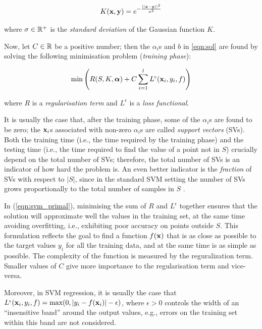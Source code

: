 \begin{equation} \label{eqn:ker}
  K(\mathbf{x},\mathbf{y}) = e^{-\frac{||\mathbf{x}-\mathbf{y}||^2}{\sigma^2}}
\end{equation}

\noindent where $\sigma \in \mathbb{R}^{+}$ is the \emph{standard deviation} of
the Gaussian function $K$.

Now, let $C \in \mathbb{R}$ be a positive number; then the $\alpha_i$s and
$b$ in \ref{eqn:sol} are found by solving the following minimisation
problem (\emph{training phase}):

\begin{equation} \label{eqn:svm_primal}
  \min \left( R(S,K,\boldsymbol{\alpha}) + C \sum_{i=1}^l L^\epsilon (\mathbf{x}_i,y_i,f) \right)
\end{equation}

\noindent where $R$ is a \emph{regularisation term} and
$L^\epsilon$ is a \emph{loss functional}.

It is usually the case that, after the training phase, some of the
$\alpha_i$s are found to be zero; the $\mathbf{x}_i$s associated with
non-zero $\alpha_i$s are called \emph{support vectors} (SVs). Both the
training time (i.e., the time required by the training phase) and the
testing time (i.e., the time required to find the value of a point not
in $S$) crucially depend on the total number of SVs; therefore, the
total number of SVs is an indicator of how hard the problem is. An
even better indicator is the \emph{fraction} of SVs with respect to
$|S|$, since in the standard SVM setting the number of SVs grows
proportionally to the total number of samples in $S$
\cite{Steinwart03}.

In (\ref{eqn:svm_primal}), minimising the sum of $R$ and $L^\epsilon$
together ensures that the solution will approximate well the values in
the training set, at the same time avoiding overfitting, i.e.,
exhibiting poor accuracy on points outside $S$. 
This formulation reflects the goal to find a function $f(\mathbf{x})$ that is
as close as possible to the target values $y_i$ for all the training data,
and at the same time is as simple as possible. The complexity of
the function is measured by the reguralization term.
Smaller values of $C$ give more importance to the regularisation
term and vice-versa.

Moreover, in SVM regression, it is usually the case that $L^\epsilon
(\mathbf{x}_i,y_i,f) = \mbox{max}(0,|y_i-f(\mathbf{x}_i)|-\epsilon)$, where
$\epsilon > 0$ controls the width of an ``insensitive band'' around
the output values, e.g., errors on the training set within this band
are not considered.

